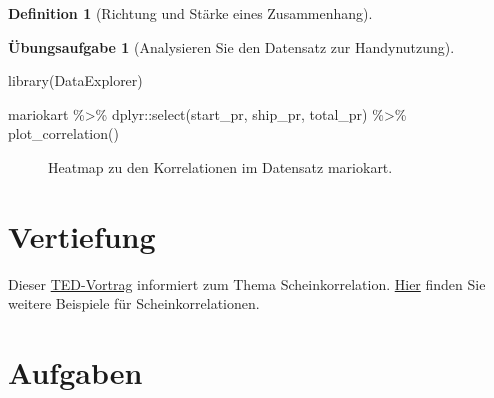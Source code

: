 \documentclass[
  a4paper,
  DIV=11]{scrreprt}
\newenvironment{Shaded}{\begin{snugshade}}{\end{snugshade}}
\newcommand{\FunctionTok}[1]{\textcolor[rgb]{0.28,0.35,0.67}{#1}}
\newcommand{\NormalTok}[1]{\textcolor[rgb]{0.00,0.23,0.31}{#1}}
\newcommand{\SpecialCharTok}[1]{\textcolor[rgb]{0.37,0.37,0.37}{#1}}
\theoremstyle{definition}
\newtheorem{exercise}{Übungsaufgabe}[chapter]
\theoremstyle{definition}
\theoremstyle{definition}
\newtheorem{definition}{Definition}[chapter]
\theoremstyle{remark}
\begin{document}
\begin{definition}[Richtung und Stärke eines
Zusammenhang]
\begin{exercise}[Analysieren Sie den Datensatz zur
Handynutzung]
\begin{Shaded}
\begin{Highlighting}[]
\FunctionTok{library}\NormalTok{(DataExplorer)}

\NormalTok{mariokart }\SpecialCharTok{\%\textgreater{}\%} 
\NormalTok{  dplyr}\SpecialCharTok{::}\FunctionTok{select}\NormalTok{(start\_pr, ship\_pr, total\_pr) }\SpecialCharTok{\%\textgreater{}\%} 
  \FunctionTok{plot\_correlation}\NormalTok{()}
\end{Highlighting}
\end{Shaded}

\begin{figure}[H]


\caption{\label{fig-mario-corr-pdf}Heatmap zu den Korrelationen im
Datensatz mariokart.}

\end{figure}%

\section{Vertiefung}\label{vertiefung-6}

Dieser \href{https://www.youtube.com/watch?v=8B271L3NtAw}{TED-Vortrag}
informiert zum Thema Scheinkorrelation.
\href{https://scheinkorrelation.jimdofree.com/}{Hier} finden Sie weitere
Beispiele für Scheinkorrelationen.

\section{Aufgaben}\label{aufgaben-6}


\end{exercise}
\end{definition}
\end{document}
